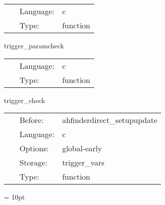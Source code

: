 \hspace{5mm}

 \begin{tabular*}{160mm}{cll} 
~ & Language:  & c \\ 
~ & Type:  & function \\ 
\end{tabular*} 


\vspace{5mm}


\hspace{5mm} trigger\_paramcheck 

\hspace{5mm}{\it parameter checking } 


\hspace{5mm}

 \begin{tabular*}{160mm}{cll} 
~ & Language:  & c \\ 
~ & Type:  & function \\ 
\end{tabular*} 


\vspace{5mm}


\hspace{5mm} trigger\_check 

\hspace{5mm}{\it test } 


\hspace{5mm}

 \begin{tabular*}{160mm}{cll} 
~ & Before:  & ahfinderdirect\_setupupdate \\ 
~ & Language:  & c \\ 
~ & Options:  & global-early \\ 
~ & Storage:  & trigger\_vars \\ 
~ & Type:  & function \\ 
\end{tabular*} 



\vspace{5mm}\parskip = 10pt 

